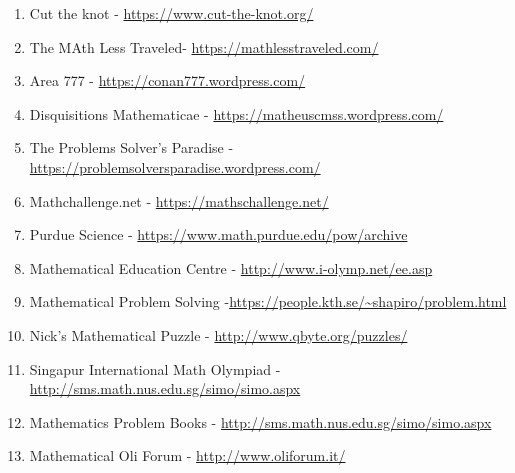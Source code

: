 \documentclass{article}
\begin{document}
\begin{enumerate}
\item Cut the knot - \url{https://www.cut-the-knot.org/}
\item The MAth Less Traveled- \url{https://mathlesstraveled.com/}
\item Area 777 - \url{https://conan777.wordpress.com/}
\item Disquisitions Mathematicae - \url{https://matheuscmss.wordpress.com/}
\item The Problems Solver's Paradise - \url{https://problemsolversparadise.wordpress.com/}
\item Mathchallenge.net - \url{https://mathschallenge.net/}
\item Purdue Science - \url{https://www.math.purdue.edu/pow/archive}
\item Mathematical Education Centre  - \url{http://www.i-olymp.net/ee.asp}
\item Mathematical Problem Solving -\url{https://people.kth.se/~shapiro/problem.html}
\item Nick's Mathematical Puzzle - \url{http://www.qbyte.org/puzzles/}
\item Singapur International Math Olympiad - \url{http://sms.math.nus.edu.sg/simo/simo.aspx}
\item Mathematics Problem Books - \url{http://sms.math.nus.edu.sg/simo/simo.aspx}
\item Mathematical Oli Forum - \url{http://www.oliforum.it/}
\end{enumerate}
\end{document}
